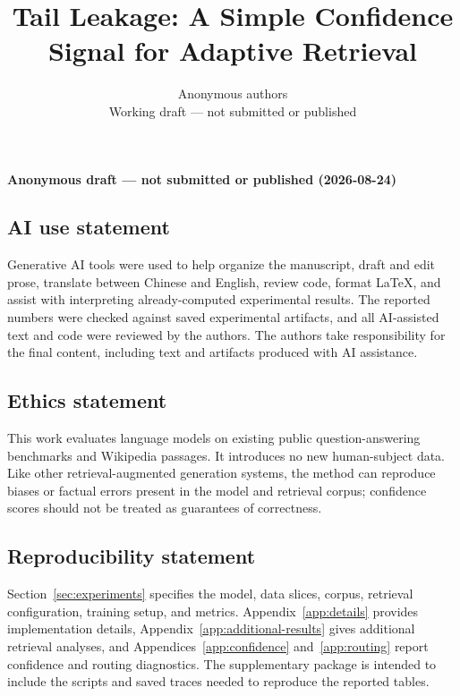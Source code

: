 \documentclass{article}
\title{Tail Leakage: A Simple Confidence Signal for Adaptive Retrieval}
\author{Anonymous authors\\
Working draft --- not submitted or published}
\begin{document}
\maketitle

\begin{center}
  \textbf{Anonymous draft --- not submitted or published (2026-08-24)}
\end{center}









\subsection*{AI use statement}
Generative AI tools were used to help organize the manuscript, draft and edit
prose, translate between Chinese and English, review code, format \LaTeX{}, and
assist with interpreting already-computed experimental results. The reported
numbers were checked against saved experimental artifacts, and all AI-assisted
text and code were reviewed by the authors. The authors take responsibility for
the final content, including text and artifacts produced with AI assistance.

\subsection*{Ethics statement}
This work evaluates language models on existing public question-answering
benchmarks and Wikipedia passages. It introduces no new human-subject data.
Like other retrieval-augmented generation systems, the method can reproduce
biases or factual errors present in the model and retrieval corpus; confidence
scores should not be treated as guarantees of correctness.

\subsection*{Reproducibility statement}
Section~\ref{sec:experiments} specifies the model, data slices, corpus,
retrieval configuration, training setup, and metrics. Appendix~\ref{app:details}
provides implementation details, Appendix~\ref{app:additional-results} gives
additional retrieval analyses, and Appendices~\ref{app:confidence}
and~\ref{app:routing} report confidence and routing diagnostics. The
supplementary package is intended to include the scripts and saved traces
needed to reproduce the reported tables.




\appendix

\end{document}
